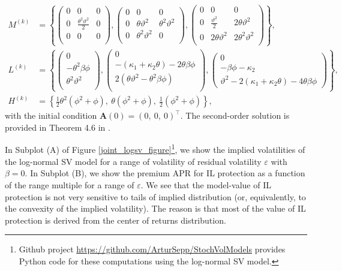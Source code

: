 \documentclass[pdftex,11pt,a4paper] {article}
\begin{document}
\begin{equation*}
\begin{split}
M^{(k)}&=\left\{
\begin{pmatrix}
0 & 0 & 0 \\
0 & \frac{\theta^2\vartheta^2}{2} & 0 \\
0 & 0 & 0 \\
&  &
\end{pmatrix}%
,
\begin{pmatrix}
0 & 0 & 0 \\
0 & \theta\vartheta^2 & \theta^2\vartheta^2 \\
0 & \theta^2\vartheta^2 & 0 \\
&  &
\end{pmatrix}%
,
\begin{pmatrix}
0 & 0 & 0 \\
0 & \frac{\vartheta^2}{2} & 2\theta\vartheta^2 \\
0 & 2\theta\vartheta^2 & 2\theta^2\vartheta^2 \\
&  &
\end{pmatrix}
\right\}, \\
L^{(k)}&=\left\{%
\begin{pmatrix}
0 \\
-\theta^2\beta\phi \\
\theta^2\vartheta^2 \\
\end{pmatrix}%
,
\begin{pmatrix}
0 \\
-(\kappa_1+\kappa_2\theta)-2\theta\beta\phi \\
2(\theta\vartheta^2-\theta^2\beta\phi) \\
\end{pmatrix}%
,
\begin{pmatrix}
0 \\
-\beta\phi-\kappa_2 \\
\vartheta^2-2(\kappa_1+\kappa_2\theta)-4\theta\beta\phi%
\end{pmatrix}
\right\}, \\
H^{(k)}&=\left\{ \frac{1}{2}\theta^2\left(\phi ^2+\phi\right), \
\theta\left(\phi ^2+\phi\right), \ \frac{1}{2}\left(\phi
^2+\phi\right) \right\},
\end{split}%
\end{equation*}
with the initial condition $\mathbf{A}(0)=( 0, \ 0, \ 0 )^\top$. The second-order solution is provided in Theorem 4.6 in \cite{SeppRakhmonoV2023}.

In Subplot (A) of Figure \ref{joint_logsv_figure}\footnote{%
Github project \url{https://github.com/ArturSepp/StochVolModels} provides
Python code for these computations using the log-normal SV model.}, we show
the implied volatilities of the log-normal SV model for a range of
volatility of residual volatility $\varepsilon$ with $\beta=0$. In Subplot
(B), we show the premium APR for IL protection as a function of the range multiple for a range of $\varepsilon$. We see that the model-value of IL
protection is not very sensitive to tails of implied distribution (or,
equivalently, to the convexity of the implied volatility). The reason is
that most of the value of IL protection is derived from the center of
returns distribution.
\end{document}
